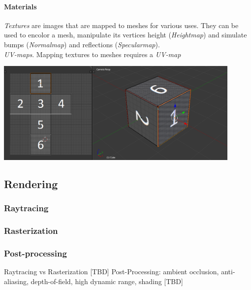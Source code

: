 \paragraph{Materials} \textit{Textures} are images that are mapped to meshes for various uses. They can be used to encolor a mesh, manipulate its vertices height (\textit{Heightmap})\cite{UnityDocHeightmap} and simulate bumps (\textit{Normalmap}\cite{UnityDocNormalmap}\cite{Cohen:1998:AS:280814.280832}\cite{745285}) and reflections (\textit{Specularmap})\cite{UnityDocSpecularmap}.\\
\textit{UV-maps}.
Mapping textures to meshes requires a \textit{UV-map}

\begin{center}
\noindent\includegraphics[width=12cm]{tex/img/ch03/CubeUVMapping.png}
\label{fig:3d-cube-uv-mapping}
\end{center}

\subsection{Rendering}
\subsubsection{Raytracing}
\subsubsection{Rasterization}
\subsubsection{Post-processing}
Raytracing \cite{Plemenos2010} vs Rasterization [TBD]
Post-Processing: ambient occlusion, anti-aliasing, depth-of-field, high dynamic range, shading [TBD]


